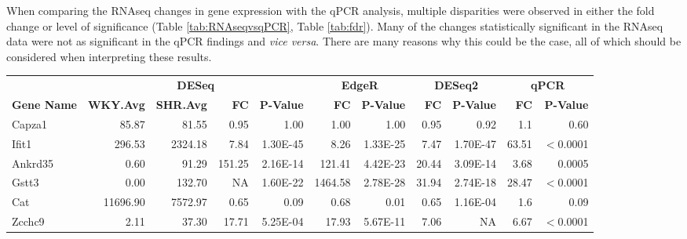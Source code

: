 When comparing the RNAseq changes in gene expression with the qPCR analysis, multiple disparities were observed in either the fold change or level of significance (Table \ref{tab:RNAseqvsqPCR}, Table \ref{tab:fdr}).  Many of the changes statistically significant in the RNAseq data were not as significant in the qPCR findings and \textit{vice versa}. There are many reasons why this could be the case, all of which should be considered when interpreting these results. 

\begin{sidewaystable}[]
\scriptsize
\centering
\begin{tabular}{lrrrrrrrr|rr}
                                      & \multicolumn{4}{c}{\textbf{DESeq}}                                             & \multicolumn{2}{c}{\textbf{EdgeR}} & \multicolumn{2}{c}{\textbf{DESeq2}} & \multicolumn{2}{c}{\textbf{qPCR}}\\
                    \textbf{Gene Name} & \textbf{WKY.Avg} & \textbf{SHR.Avg} & \textbf{FC} & \textbf{P-Value} & \textbf{FC}   & \textbf{P-Value}   & \textbf{FC}    & \textbf{P-Value}  &   \textbf{FC}  & \textbf{P-Value}\\
\hline
 Capza1            & 85.87                 & 81.55                 & 0.95        & 1.00             & 1.00          & 1.00               & 0.95           & 0.92                & 1.1   & 0.60 \\
 Ifit1             & 296.53                & 2324.18               & 7.84        & 1.30E-45         & 8.26          & 1.33E-25           & 7.47           & 1.70E-47            & 63.51 & $<$0.0001 \\
 Ankrd35           & 0.60                  & 91.29                 & 151.25      & 2.16E-14         & 121.41        & 4.42E-23           & 20.44          & 3.09E-14            & 3.68  & 0.0005 \\
 Gstt3             & 0.00                  & 132.70                & NA          & 1.60E-22         & 1464.58       & 2.78E-28           & 31.94          & 2.74E-18            & 28.47 & $<$0.0001 \\
 Cat               & 11696.90              & 7572.97               & 0.65        & 0.09             & 0.68          & 0.01               & 0.65           & 1.16E-04            & 1.6   & 0.09 \\
 Zcchc9            & 2.11                  & 37.30                 & 17.71       & 5.25E-04         & 17.93         & 5.67E-11           & 7.06           & NA                  & 6.67  & $<$0.0001 \\

\end{tabular}
\end{sidewaystable}
